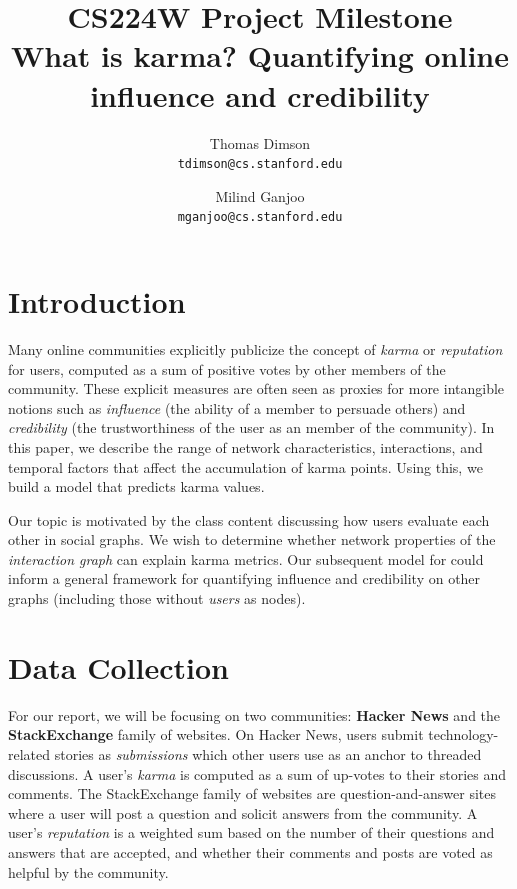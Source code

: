 \documentclass[10pt]{article}
\title{{\large CS224W Project Milestone} \\
  What is karma? Quantifying online influence and credibility
}
\author{Thomas Dimson \\ {\tt tdimson@cs.stanford.edu}
  \and
  Milind Ganjoo \\ {\tt mganjoo@cs.stanford.edu}
}
\date{}
\begin{document}
\maketitle


\section{Introduction}
Many online communities explicitly publicize the concept of \textit{karma} or
\textit{reputation} for users, computed as a sum of positive votes by other members of
the community. These explicit measures are often seen as proxies for more
intangible notions such as \textit{influence} (the ability of a member to
persuade others) and \textit{credibility} (the trustworthiness of the user as an
member of the community). In this paper, we describe the range of network
characteristics, interactions, and temporal factors that affect the accumulation
of karma points. Using this, we build a model that predicts karma values.

Our topic is motivated by the class content discussing how users evaluate
each other in social graphs. We wish to determine whether network properties of the 
\textit{interaction graph} can explain karma metrics. Our subsequent model for 
could inform a general framework for quantifying influence and credibility
on other graphs (including those without \textit{users} as nodes).

\section{Data Collection}
For our report, we will be focusing on two communities: \textbf{Hacker News}
and the \textbf{StackExchange} family of websites. On Hacker News, users submit
technology-related stories as \textit{submissions} which other users
use as an anchor to threaded discussions. A user's \textit{karma} is computed
as a sum of up-votes to their stories and comments. The StackExchange family of 
websites are question-and-answer sites where a user will post a question and
solicit answers from the community. A user's \textit{reputation} is a weighted
sum based on the number of their questions and answers that are accepted, and
whether their comments and posts are voted as helpful by the community.
\end{document}
